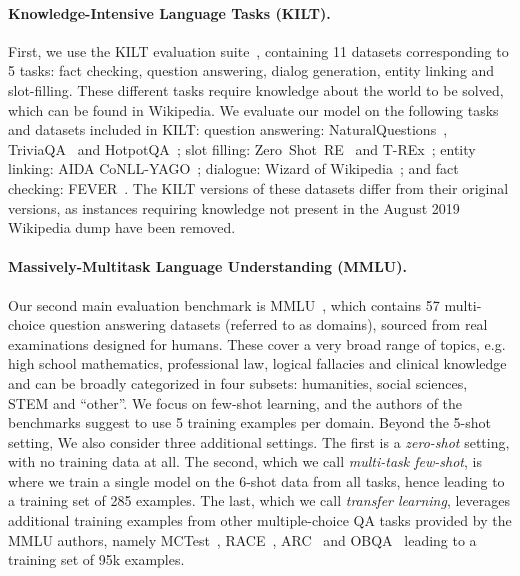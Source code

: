 \documentclass[10pt]{article} \usepackage[preprint]{tmlr}
\begin{document}
\paragraph{Knowledge-Intensive Language Tasks (KILT).} First, we use the KILT evaluation suite~\citep{petroni2020context}, containing 11 datasets corresponding to 5 tasks: fact checking, question answering, dialog generation, entity linking and slot-filling.
These different tasks require knowledge about the world to be solved, which can be found in Wikipedia.
We evaluate our model on the following tasks and datasets included in KILT: question answering: NaturalQuestions~\citep{kwiatkowski2019natural}, TriviaQA~\citep{JoshiTriviaQA2017} and HotpotQA~\citep{yang2018hotpotqa}; slot filling: Zero~Shot~RE~\citep{levy2017zero} and T-REx~\citep{elsahar2018trex}; entity linking: AIDA CoNLL-YAGO~\citep{hoffart2011robust}; dialogue: Wizard of Wikipedia~\citep{dinan2019wizardofwikipedia}; and fact checking: FEVER~\citep{thorne2018fever}.
The KILT versions of these datasets differ from their original versions, as instances requiring knowledge not present in the August 2019 Wikipedia dump have been removed.

\paragraph{Massively-Multitask Language Understanding (MMLU).} Our second main evaluation benchmark is MMLU~\citep{hendrycks2021mmlu}, which contains 57 multi-choice question answering datasets (referred to as domains), sourced from real examinations designed for humans.
These cover a very broad range of topics, e.g. high school mathematics, professional law, logical fallacies and clinical knowledge and can be broadly categorized in four subsets: humanities, social sciences, STEM and ``other''.
We focus on few-shot learning, and the authors of the benchmarks suggest to use 5 training examples per domain.
Beyond the 5-shot setting, We also consider three additional settings.
The first is a \emph{zero-shot} setting, with no training data at all.
The second, which we call \emph{multi-task few-shot}, is where we train a single model on the 6-shot data from all tasks, hence leading to a training set of 285 examples.
The last, which we call \emph{transfer learning}, leverages additional training examples from other multiple-choice QA tasks provided by the MMLU authors, namely MCTest~\citep{richardson_mctest:_2013}, RACE~\citep{lai-etal-2017-race}, ARC~\citep{Clark2018ThinkYH} and OBQA~\citep{mihaylov-etal-2018-suit} leading to a training set of 95k examples.
\end{document}
